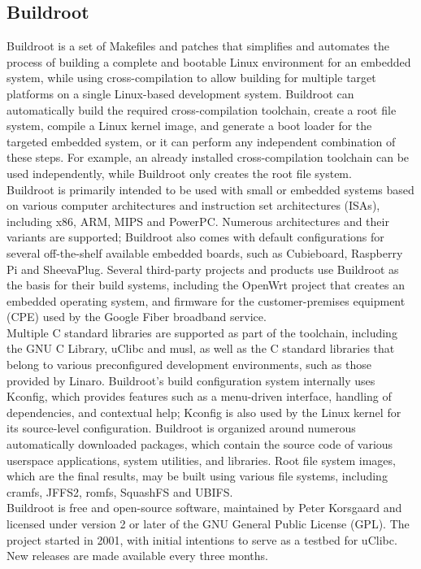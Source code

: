 \subsection{Buildroot}
Buildroot is a set of Makefiles and patches that simplifies and automates the process of building a complete and bootable Linux environment for an embedded system, while using cross-compilation to allow building for multiple target platforms on a single Linux-based development system. Buildroot can automatically build the required cross-compilation toolchain, create a root file system, compile a Linux kernel image, and generate a boot loader for the targeted embedded system, or it can perform any independent combination of these steps. For example, an already installed cross-compilation toolchain can be used independently, while Buildroot only creates the root file system. \\
Buildroot is primarily intended to be used with small or embedded systems based on various computer architectures and instruction set architectures (ISAs), including x86, ARM, MIPS and PowerPC. Numerous architectures and their variants are supported; Buildroot also comes with default configurations for several off-the-shelf available embedded boards, such as Cubieboard, Raspberry Pi and SheevaPlug. Several third-party projects and products use Buildroot as the basis for their build systems, including the OpenWrt project that creates an embedded operating system, and firmware for the customer-premises equipment (CPE) used by the Google Fiber broadband service.\\
Multiple C standard libraries are supported as part of the toolchain, including the GNU C Library, uClibc and musl, as well as the C standard libraries that belong to various preconfigured development environments, such as those provided by Linaro. Buildroot's build configuration system internally uses Kconfig, which provides features such as a menu-driven interface, handling of dependencies, and contextual help; Kconfig is also used by the Linux kernel for its source-level configuration. Buildroot is organized around numerous automatically downloaded packages, which contain the source code of various userspace applications, system utilities, and libraries. Root file system images, which are the final results, may be built using various file systems, including cramfs, JFFS2, romfs, SquashFS and UBIFS.\\
Buildroot is free and open-source software, maintained by Peter Korsgaard and licensed under version 2 or later of the GNU General Public License (GPL). The project started in 2001, with initial intentions to serve as a testbed for uClibc. New releases are made available every three months.
